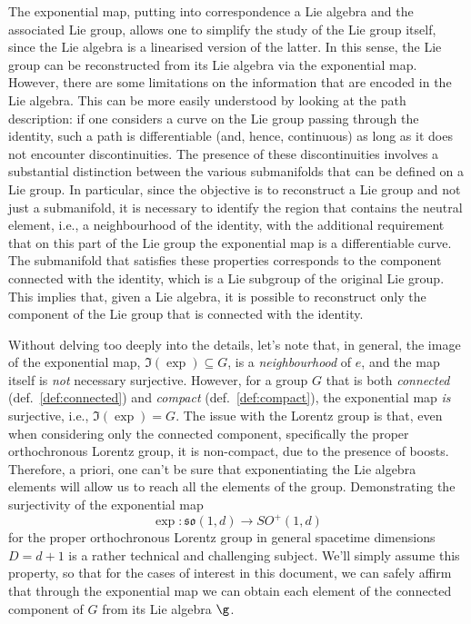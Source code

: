 The exponential map, putting into correspondence a Lie algebra and the associated Lie group, allows one to simplify the study of the Lie group itself, since the Lie algebra is a linearised version of the latter. In this sense, the Lie group can be reconstructed from its Lie algebra via the exponential map. However, there are some limitations on the information that are encoded in the Lie algebra. This can be more easily understood by looking at the path description: if one considers a curve on the Lie group passing through the identity, such a path is differentiable (and, hence, continuous) as long as it does not encounter discontinuities. The presence of these discontinuities involves a substantial distinction between the various submanifolds that can be defined on a Lie group. In particular, since the objective is to reconstruct a Lie group and not just a submanifold, it is necessary to identify the region that contains the neutral element, i.e., a neighbourhood of the identity, with the additional requirement that on this part of the Lie group the exponential map is a differentiable curve. The submanifold that satisfies these properties corresponds to the component connected with the identity, which is a Lie subgroup of the original Lie group. This implies that, given a Lie algebra, it is possible to reconstruct only the component of the Lie group that is connected with the identity.

Without delving too deeply into the details, let's note that, in general, the image of the exponential map, $\Im(\exp) \subseteq G$, is a \emph{neighbourhood} of $e$, and the map itself is \emph{not} necessary surjective. However, for a group $G$ that is both \emph{connected} (def.~\ref{def:connected}) and \emph{compact} (def.~\ref{def:compact}), the exponential map \emph{is} surjective, i.e., $\Im(\exp) = G$. The issue with the Lorentz group is that, even when considering only the connected component, specifically the proper orthochronous Lorentz group, it is non-compact, due to the presence of boosts. Therefore, a priori, one can't be sure that exponentiating the Lie algebra elements will allow us to reach all the elements of the group. Demonstrating the surjectivity of the exponential map
\begin{equation}
    \exp \colon \mathfrak{so}(1,d) \to SO^+(1,d)
\end{equation}
for the proper orthochronous Lorentz group in general spacetime dimensions $D = d + 1$ is a rather technical and challenging subject. We'll simply assume this property, so that for the cases of interest in this document, we can safely affirm that through the exponential map we can obtain each element of the connected component of $G$ from its Lie algebra $\g$. 

